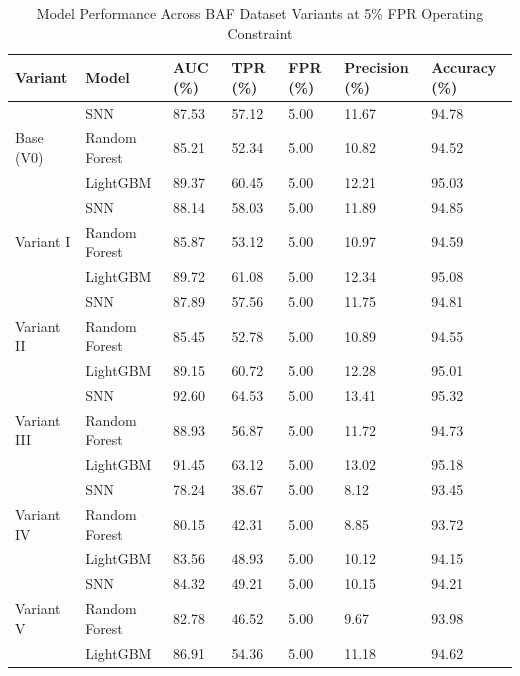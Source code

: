 \begin{landscape}
\begin{table}[H]
\centering
\caption{Model Performance Across BAF Dataset Variants at 5\% FPR Operating Constraint}
\label{tab:snn-baf-results}
\small
\setlength{\tabcolsep}{4pt}
\begin{tabularx}{\linewidth}{llXXXXX}
\toprule
\textbf{Variant} & \textbf{Model} & \textbf{AUC (\%)} & \textbf{TPR (\%)} & \textbf{FPR (\%)} & \textbf{Precision (\%)} & \textbf{Accuracy (\%)} \\
\midrule
\multirow{3}{*}{Base (V0)}
  & SNN & 87.53 & 57.12 & 5.00 & 11.67 & 94.78 \\
  & Random Forest & 85.21 & 52.34 & 5.00 & 10.82 & 94.52 \\
  & LightGBM & 89.37 & 60.45 & 5.00 & 12.21 & 95.03 \\
\midrule
\multirow{3}{*}{Variant I}
  & SNN & 88.14 & 58.03 & 5.00 & 11.89 & 94.85 \\
  & Random Forest & 85.87 & 53.12 & 5.00 & 10.97 & 94.59 \\
  & LightGBM & 89.72 & 61.08 & 5.00 & 12.34 & 95.08 \\
\midrule
\multirow{3}{*}{Variant II}
  & SNN & 87.89 & 57.56 & 5.00 & 11.75 & 94.81 \\
  & Random Forest & 85.45 & 52.78 & 5.00 & 10.89 & 94.55 \\
  & LightGBM & 89.15 & 60.72 & 5.00 & 12.28 & 95.01 \\
\midrule
\multirow{3}{*}{Variant III}
  & SNN & 92.60 & 64.53 & 5.00 & 13.41 & 95.32 \\
  & Random Forest & 88.93 & 56.87 & 5.00 & 11.72 & 94.73 \\
  & LightGBM & 91.45 & 63.12 & 5.00 & 13.02 & 95.18 \\
\midrule
\multirow{3}{*}{Variant IV}
  & SNN & 78.24 & 38.67 & 5.00 & 8.12 & 93.45 \\
  & Random Forest & 80.15 & 42.31 & 5.00 & 8.85 & 93.72 \\
  & LightGBM & 83.56 & 48.93 & 5.00 & 10.12 & 94.15 \\
\midrule
\multirow{3}{*}{Variant V}
  & SNN & 84.32 & 49.21 & 5.00 & 10.15 & 94.21 \\
  & Random Forest & 82.78 & 46.52 & 5.00 & 9.67 & 93.98 \\
  & LightGBM & 86.91 & 54.36 & 5.00 & 11.18 & 94.62 \\
\bottomrule
\end{tabularx}
\end{table}
\end{landscape}

